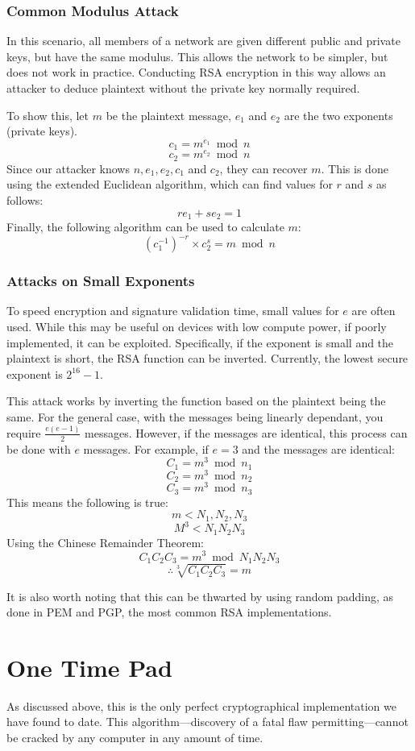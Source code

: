 			\subsubsection{Common Modulus Attack}
				In this scenario, all members of a network are given different public and private keys, but have the same modulus.
				This allows the network to be simpler, but does not work in practice. 
				Conducting RSA encryption in this way allows an attacker to deduce plaintext without the private key normally required. 

				To show this, let $m$ be the plaintext message, $e_1$ and $e_2$ are the two exponents (private keys). 
				\[c_1 = m^{e_1}\bmod{n}\]
				\[c_2 = m^{e_2}\bmod{n}\]
				Since our attacker knows $n, e_1, e_2, c_1$ and $c_2$, they can recover $m$. 
				This is done using the extended Euclidean algorithm, which can find values for $r$ and $s$ as follows:
				\[re_1 + se_2 = 1\]
				Finally, the following algorithm can be used to calculate $m$:
				\[(c^{-1}_{1})^{-r} \times c^{s}_{2} = m\bmod{n}\]

			\subsubsection{Attacks on Small Exponents}
				To speed encryption and signature validation time, small values for $e$ are often used. 
				While this may be useful on devices with low compute power, if poorly implemented, it can be exploited. 
				Specifically, if the exponent is small and the plaintext is short, the RSA function can be inverted. 
				Currently, the lowest secure exponent is $2^{16}-1$. 

				This attack works by inverting the function based on the plaintext being the same. 
				For the general case, with the messages being linearly dependant, you require $\frac{e(e-1)}{2}$ messages. 
				However, if the messages are identical, this process can be done with $e$ messages.
				For example, if $e = 3$ and the messages are identical:
				\[C_1 = m^3\bmod{n_1}\]
				\[C_2 = m^3\bmod{n_2}\]
				\[C_3 = m^3\bmod{n_3}\]
				This means the following is true:
				\[m < {N_1, N_2, N_3}\]
				\[M^3 < N_1N_2N_3\]
				Using the Chinese Remainder Theorem:
				\[C_1C_2C_3 = m^3\bmod{N_1N_2N_3}\]
				\[\therefore \sqrt[3]{C_1C_2C_3} = m\]

				It is also worth noting that this can be thwarted by using random padding, as done in PEM and PGP, the most common RSA implementations.  
	\section{One Time Pad}
		As discussed above, this is the only perfect cryptographical implementation we have found to date. 
		This algorithm---discovery of a fatal flaw permitting---cannot be cracked by any computer in any amount of time. 

